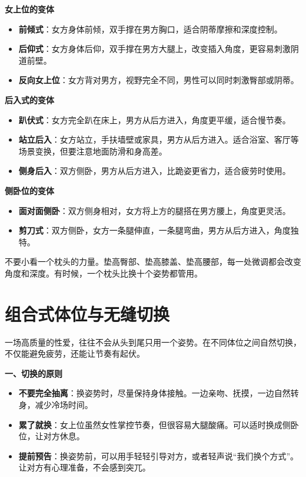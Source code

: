 \documentclass[12pt,UTF8]{ctexbook}
\begin{document}
\textbf{女上位的变体}

\begin{itemize}
\item \textbf{前倾式}：女方身体前倾，双手撑在男方胸口，适合阴蒂摩擦和深度控制。
\item \textbf{后仰式}：女方身体后仰，双手撑在男方大腿上，改变插入角度，更容易刺激阴道前壁。
\item \textbf{反向女上位}：女方背对男方，视野完全不同，男性可以同时刺激臀部或阴蒂。
\end{itemize}

\textbf{后入式的变体}

\begin{itemize}
\item \textbf{趴伏式}：女方完全趴在床上，男方从后方进入，角度更平缓，适合慢节奏。
\item \textbf{站立后入}：女方站立，手扶墙壁或家具，男方从后方进入。适合浴室、客厅等场景变换，但要注意地面防滑和身高差。
\item \textbf{侧身后入}：双方侧卧，男方从后方进入，比跪姿更省力，适合疲劳时使用。
\end{itemize}

\textbf{侧卧位的变体}

\begin{itemize}
\item \textbf{面对面侧卧}：双方侧身相对，女方将上方的腿搭在男方腰上，角度更灵活。
\item \textbf{剪刀式}：双方侧卧，女方一条腿伸直，一条腿弯曲，男方从后方进入，角度独特。
\end{itemize}

\begin{tcolorbox}[colback=pink!5!white,colframe=red!50!black,title=贴心小叮咛]
不要小看一个枕头的力量。垫高臀部、垫高膝盖、垫高腰部，每一处微调都会改变角度和深度。有时候，一个枕头比换十个姿势都管用。
\end{tcolorbox}

\section{组合式体位与无缝切换}

一场高质量的性爱，往往不会从头到尾只用一个姿势。在不同体位之间自然切换，不仅能避免疲劳，还能让节奏有起伏。

\textbf{一、切换的原则}

\begin{itemize}
\item \textbf{不要完全抽离}：换姿势时，尽量保持身体接触。一边亲吻、抚摸，一边自然转身，减少冷场时间。
\item \textbf{累了就换}：女上位虽然女性掌控节奏，但很容易大腿酸痛。可以适时换成侧卧位，让对方休息。
\item \textbf{提前预告}：换姿势前，可以用手轻轻引导对方，或者轻声说“我们换个方式”。让对方有心理准备，不会感到突兀。
\end{itemize}
\end{document}
